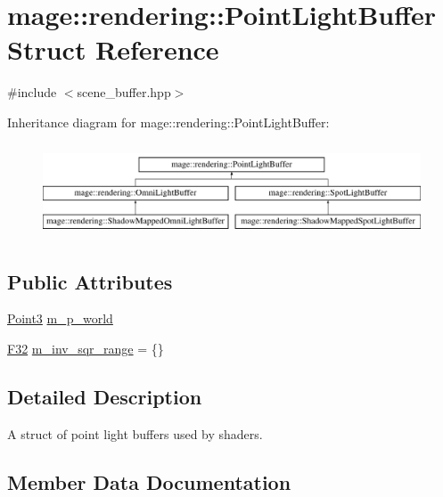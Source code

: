 \hypertarget{structmage_1_1rendering_1_1_point_light_buffer}{}\section{mage\+:\+:rendering\+:\+:Point\+Light\+Buffer Struct Reference}
\label{structmage_1_1rendering_1_1_point_light_buffer}


{\ttfamily \#include $<$scene\+\_\+buffer.\+hpp$>$}

Inheritance diagram for mage\+:\+:rendering\+:\+:Point\+Light\+Buffer\+:\begin{figure}[H]
\begin{center}
\leavevmode
\includegraphics[height=2.809365cm]{structmage_1_1rendering_1_1_point_light_buffer}
\end{center}
\end{figure}
\subsection*{Public Attributes}
\begin{DoxyCompactItemize}
\item 
\mbox{\hyperlink{structmage_1_1_point3}{Point3}} \mbox{\hyperlink{structmage_1_1rendering_1_1_point_light_buffer_abbc64dd98dec18dadc0a3c0003c0e750}{m\+\_\+p\+\_\+world}}
\item 
\mbox{\hyperlink{namespacemage_aa97e833b45f06d60a0a9c4fc22ae02c0}{F32}} \mbox{\hyperlink{structmage_1_1rendering_1_1_point_light_buffer_ad351e938a243a19ce0ba55792d2aed65}{m\+\_\+inv\+\_\+sqr\+\_\+range}} = \{\}
\end{DoxyCompactItemize}


\subsection{Detailed Description}
A struct of point light buffers used by shaders. 

\subsection{Member Data Documentation}
\mbox{\label{structmage_1_1rendering_1_1_point_light_buffer_ad351e938a243a19ce0ba55792d2aed65}} 
